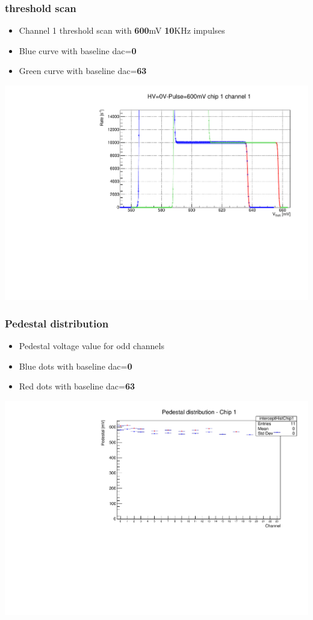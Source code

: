 \documentclass[aspectratio=169]{beamer}
\begin{document}
	\begin{frame}
	\frametitle{threshold scan}
		\begin{itemize}
			\item Channel 1 threshold scan with \textbf{600}mV \textbf{10}KHz impulses
			\item {\color{blue}Blue} curve with baseline dac=\textbf{0}
			\item {\color{green}Green} curve with baseline dac=\textbf{63}  
		\end{itemize}	
		\begin{center}
			\includegraphics[width=0.65 \textwidth]{IMG/ThScan_ch0.pdf}
		\end{center}
		
	\end{frame}

	\begin{frame}
	\frametitle{Pedestal distribution}
	\begin{itemize}
		\item Pedestal voltage value for odd channels
		\item {\color{blue}Blue} dots with baseline dac=\textbf{0}
		\item {\color{red}Red} dots with baseline dac=\textbf{63}
	\end{itemize}
	\begin{center}
		\includegraphics[width=0.65 \textwidth]{IMG/TB1-DAC0-DAC63.pdf}
	\end{center}
	
	\end{frame}
\end{document}
